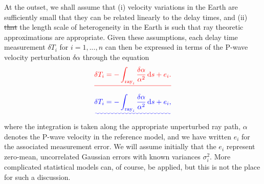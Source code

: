 \documentclass[a4paper,12pt]{paper}
\providecommand{\DIFadd}[1]{{\protect\color{blue}\uwave{#1}}} %
\providecommand{\DIFdel}[1]{{\protect\color{red}\sout{#1}}}                      %
\providecommand{\DIFaddbegin}{} %
\providecommand{\DIFaddend}{} %
\providecommand{\DIFdelbegin}{} %
\providecommand{\DIFdelend}{} %
\begin{document}
At the outset, we shall assume that (i) velocity variations in the Earth are sufficiently small that they can be related linearly 
to the delay times, and (ii) \DIFdelbegin \DIFdel{that }\DIFdelend the length scale of heterogeneity in the Earth is such that ray theoretic approximations are 
appropriate. Given these assumptions, each delay time measurement $\delta T_{i}$ for \DIFdelbegin \DIFdel{$i=1,...,n$ }\DIFdelend \DIFaddbegin \DIFadd{$i=1,\dots,n$ }\DIFaddend can then be expressed in terms 
of the P-wave velocity perturbation $\delta\alpha$ through the equation
\DIFdelbegin \begin{displaymath}
    \DIFdel{\delta T_{i} = -\int_{\text{ray}_{i}} \frac{\delta\alpha}{\alpha^{2}} \dd s + e_{i}.
}\end{displaymath}%
\DIFdelend \DIFaddbegin \begin{equation}
    \DIFadd{\delta T_{i} = -\int_{\mathrm{ray}_{i}} \frac{\delta\alpha}{\alpha^{2}} \dd s + e_{i},
    \label{eq:7}
}\end{equation}\DIFaddend 
where the integration is taken along the appropriate unperturbed ray path, $\alpha$ denotes the P-wave velocity in the reference model, 
and we have written $e_{i}$ for the associated measurement error. We will assume initially that the $e_{i}$ represent zero-mean, 
uncorrelated Gaussian errors with known variances $\sigma_{i}^{2}$. More complicated statistical models can, of course, be applied, 
but this is not the place for such a discussion.
\end{document}
